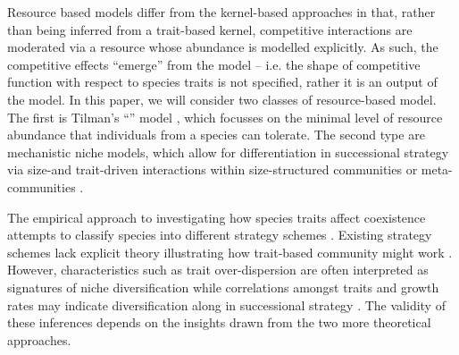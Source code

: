 \documentclass[a4paper,11pt]{article}
\begin{document}
Resource based models differ from the kernel-based approaches in that,
rather than being inferred from a trait-based kernel, competitive
interactions are moderated via a resource whose abundance is modelled
explicitly.  As such, the competitive effects ``emerge'' from the
model -- i.e. the shape of competitive function with respect to
species traits is not specified, rather it is an output of the model.
%
In this paper, we will consider two classes of resource-based model.
%
The first is Tilman's ``\Rstar'' model \citep{Tilman-1977,
  Tilman-1982}, which focusses on the minimal level of resource
abundance that individuals from a species can tolerate.
%
%
The second type are mechanistic niche models, which allow for 
differentiation in successional strategy via size-and
trait-driven interactions within size-structured communities or
meta-communities
\citep{Huston-1987,Kohyama-1993,Moorcroft-2001,Falster-2011}.

The empirical approach to investigating how species traits affect
coexistence attempts to classify species into different strategy
schemes
\citep{Grime-1974,Grime-1979,Southwood-1977,Weiher-1999,Westoby-2002}.
%
%
Existing strategy schemes lack explicit theory illustrating how
trait-based community might work \citep{Adler-2013}.
However, characteristics such as trait over-dispersion are often
interpreted as
signatures of niche diversification \citep[e.g.][]{Kraft-2008} while
correlations amongst traits and growth rates may indicate
diversification along in successional strategy \citep[e.g.][]{Wright-2010}.
%
The validity of these inferences depends on the insights drawn from
the two more theoretical approaches.
\end{document}
